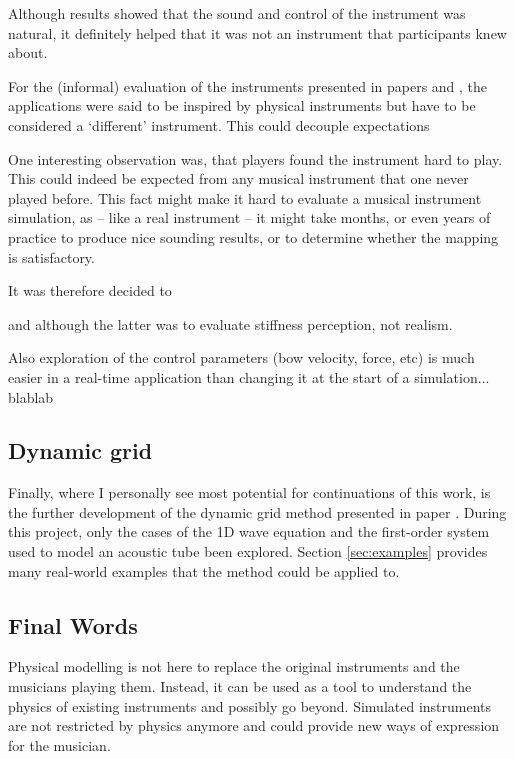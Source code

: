 Although results showed that the sound and control of the instrument was natural, it definitely helped that it was not an instrument that participants knew about. 

For the (informal) evaluation of the instruments presented in papers \citeP[A] and \citeP[B], the applications were said to be inspired by physical instruments but have to be considered a `different' instrument. This could decouple expectations

One interesting observation was, that players found the instrument hard to play. This could indeed be expected from any musical instrument that one never played before. This fact might make it hard to evaluate a musical instrument simulation, as -- like a real instrument -- it might take months, or even years of practice to produce nice sounding results, or to determine whether the mapping is satisfactory.

It was therefore decided to 


and \citeP[F] although the latter was to evaluate stiffness perception, not realism. 



Also exploration of the control parameters (bow velocity, force, etc) is much easier in a real-time application than changing it at the start of a simulation... blablab

\subsection{Dynamic grid}
Finally, where I personally see most potential for continuations of this work, is the further development of the dynamic grid method presented in paper \citeP[G]. During this project, only the cases of the 1D wave equation and the first-order system used to model an acoustic tube been explored. Section \ref{sec:examples} provides many real-world examples that the method could be applied to.

\subsection{Final Words}
Physical modelling is not here to replace the original instruments and the musicians playing them. Instead, it can be used as a tool to understand the physics of existing instruments and possibly go beyond. Simulated instruments are not restricted by physics anymore and could provide new ways of expression for the musician. 